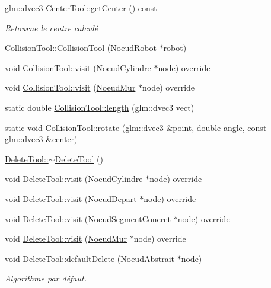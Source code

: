 \begin{DoxyCompactItemize}
glm\-::dvec3 \hyperlink{group__inf2990_gaf086e5f530c5189f4b72563a4abfe35f}{Center\-Tool\-::get\-Center} () const 
\begin{DoxyCompactList}\small\item\em Retourne le centre calculé \end{DoxyCompactList}\item 
\hyperlink{group__inf2990_ga2f19aaeb96c50199582fbd6146a22505}{Collision\-Tool\-::\-Collision\-Tool} (\hyperlink{class_noeud_robot}{Noeud\-Robot} $\ast$robot)
\item 
void \hyperlink{group__inf2990_gaeabc2a2158a27714c8db5c076fe40720}{Collision\-Tool\-::visit} (\hyperlink{class_noeud_cylindre}{Noeud\-Cylindre} $\ast$node) override
\item 
void \hyperlink{group__inf2990_ga25177ba7c7bb3179b850f4b702906b38}{Collision\-Tool\-::visit} (\hyperlink{class_noeud_mur}{Noeud\-Mur} $\ast$node) override
\item 
static double \hyperlink{group__inf2990_gacde31d7d23d078dae0286e8f3088bb32}{Collision\-Tool\-::length} (glm\-::dvec3 vect)
\item 
static void \hyperlink{group__inf2990_gabf47107895dd5a494323f678fd430385}{Collision\-Tool\-::rotate} (glm\-::dvec3 \&point, double angle, const glm\-::dvec3 \&center)
\item 
\hyperlink{group__inf2990_ga4a54f710ae3ca5e4eb8e16610d07c3bc}{Delete\-Tool\-::$\sim$\-Delete\-Tool} ()
\item 
void \hyperlink{group__inf2990_gaf91f134881ce52596486855f405e8f96}{Delete\-Tool\-::visit} (\hyperlink{class_noeud_cylindre}{Noeud\-Cylindre} $\ast$node) override
\item 
void \hyperlink{group__inf2990_ga9efc126da05a809724a3a2597ac4cb57}{Delete\-Tool\-::visit} (\hyperlink{class_noeud_depart}{Noeud\-Depart} $\ast$node) override
\item 
void \hyperlink{group__inf2990_ga1908b4ee57bb2dfbf4022412b48470d8}{Delete\-Tool\-::visit} (\hyperlink{class_noeud_segment_concret}{Noeud\-Segment\-Concret} $\ast$node) override
\item 
void \hyperlink{group__inf2990_ga816147276bc393b0552e031441541726}{Delete\-Tool\-::visit} (\hyperlink{class_noeud_mur}{Noeud\-Mur} $\ast$node) override
\item 
void \hyperlink{group__inf2990_gab16541bc54ef7e060c56d59d64798805}{Delete\-Tool\-::default\-Delete} (\hyperlink{class_noeud_abstrait}{Noeud\-Abstrait} $\ast$node)
\begin{DoxyCompactList}\small\item\em Algorithme par défaut. \end{DoxyCompactList}\item 

\end{DoxyCompactItemize}
